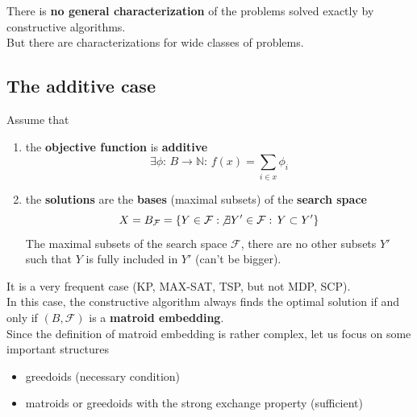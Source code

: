 There is \textbf{no general characterization} of the problems solved exactly by constructive algorithms.\\

But there are characterizations for wide classes of problems.\\

\newpage

\subsection{The additive case}
Assume that
\begin{enumerate}
	\item the \textbf{objective function} is \textbf{additive}
	$$ \exists \phi: \, B \rightarrow \mathbb{N}: \, f(x) = \sum_{i \in x} \phi_i $$
	
	\item the \textbf{solutions} are the \textbf{bases} (maximal subsets) of the \textbf{search space}
	$$ X = B_{\mathcal{F}} = \left\{Y \in \mathcal{F}: \, \not \exists Y' \in \mathcal{F}: \, Y \subset Y' \right\} $$
	The maximal subsets of the search space $\mathcal{F}$, there are no other subsets $Y'$ such that $Y$ is fully included in $Y'$ (can't be bigger).
\end{enumerate}

It is a very frequent case (KP, MAX-SAT, TSP, but not MDP, SCP).\\

In this case, the constructive algorithm always finds the optimal solution if and only if $(B, \mathcal{F})$ is a \textbf{matroid embedding}.\\

Since the definition of matroid embedding is rather complex, let us focus on some important structures
\begin{itemize}
	\item greedoids (necessary condition)
	\item matroids or greedoids with the strong exchange property (sufficient)
\end{itemize}

\newpage

